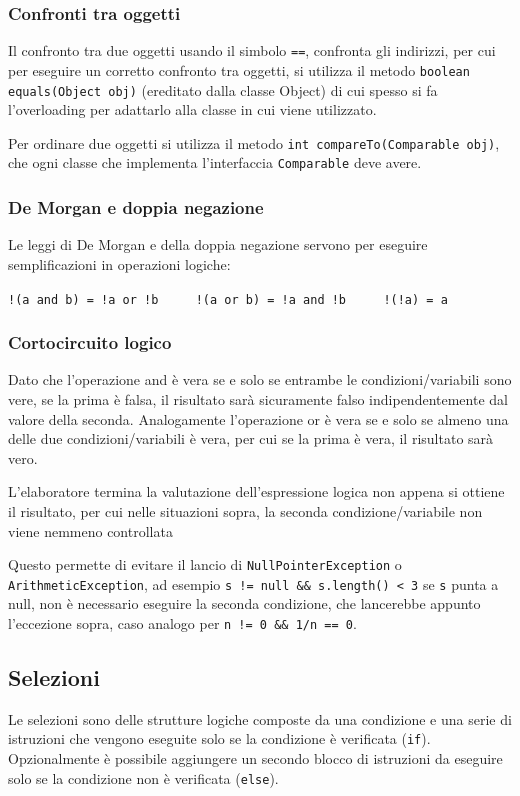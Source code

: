 \documentclass[a4paper]{article}
\begin{document}
\subsubsection*{Confronti tra oggetti}
Il confronto tra due oggetti usando il simbolo \verb|==|, confronta gli indirizzi, per cui per eseguire un corretto confronto tra
oggetti, si utilizza il metodo \verb|boolean equals(Object obj)| (ereditato dalla classe Object) di cui spesso si fa l'overloading
per adattarlo alla classe in cui viene utilizzato.

Per ordinare due oggetti si utilizza il metodo \verb|int compareTo(Comparable obj)|, che ogni classe che implementa l'interfaccia
\verb|Comparable| deve avere.

\subsubsection*{De Morgan e doppia negazione}
Le leggi di De Morgan e della doppia negazione servono per eseguire semplificazioni in operazioni logiche:
\begin{center}
	\verb|!(a and b) = !a or !b| \(\qquad\) \verb|!(a or b) = !a and !b| \(\qquad\) \verb|!(!a) = a|
\end{center}

\subsubsection*{Cortocircuito logico}
Dato che l'operazione and è vera se e solo se entrambe le condizioni/variabili sono vere, se la prima è falsa, il risultato sarà
sicuramente falso indipendentemente dal valore della seconda. Analogamente l'operazione or è vera se e solo se almeno una delle
due condizioni/variabili è vera, per cui se la prima è vera, il risultato sarà vero.

L'elaboratore termina la valutazione dell'espressione logica non appena si ottiene il risultato, per cui nelle situazioni sopra,
la seconda condizione/variabile non viene nemmeno controllata

Questo permette di evitare il lancio di \verb|NullPointerException| o \verb|ArithmeticException|, ad esempio \verb|s != null && s.length() < 3|
se \verb|s| punta a null, non è necessario eseguire la seconda condizione, che lancerebbe appunto l'eccezione sopra, caso analogo per \verb|n != 0 && 1/n == 0|.

\newpage


\subsection{Selezioni}
Le selezioni sono delle strutture logiche composte da una condizione e una serie di istruzioni che vengono eseguite solo se la
condizione è verificata (\verb|if|). Opzionalmente è possibile aggiungere un secondo blocco di istruzioni da eseguire solo
se la condizione non è verificata (\verb|else|).
\end{document}
